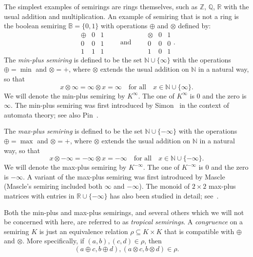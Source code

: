 \documentclass{amsart}
\newcommand{\AND}{\qquad\text{and}\qquad}
\newcommand{\R}{\mathbb{R}}
\newcommand{\Q}{\mathbb{Q}}
\newcommand{\Z}{\mathbb{Z}}
\newcommand{\N}{\mathbb{N}}
\numberwithin{equation}{section}
\theoremstyle{definition}
\begin{document}
The simplest examples of semirings are rings themselves, such as $\Z$, $\Q$,
$\R$ with the usual addition and multiplication. An example of semiring that is
not a ring is the boolean semiring $\mathbb{B} = \{0, 1\}$ with operations
$\oplus$ and $\otimes$ defined by:
\begin{equation*}
  \begin{array}{c|cc}
    \oplus & 0 & 1 \\
    \hline
    0      & 0 & 1 \\
    1      & 1 & 1 
  \end{array}\AND
  \begin{array}{c|cc}
    \otimes & 0 & 1 \\
    \hline
    0       & 0 & 0 \\
    1       & 0 & 1 
  \end{array}.
\end{equation*}
The \textit{min-plus semiring} is defined to be the set $\N \cup \{\infty\}$
with the operations $\oplus = \min$ and $\otimes = +$, where $\otimes$ extends
the usual addition on $\N$ in a natural way, so that
$$x \otimes \infty = \infty \otimes x = \infty  \quad \text{for all}\quad x\in
\N\cup \{\infty\}.$$
We will denote the min-plus semiring by $K^{\infty}$. The one of $K^{\infty}$
is $0$ and the zero is $\infty$.  The min-plus semiring was first introduced by
Simon~\cite{Simon1978aa} in the context of automata theory; see also
Pin~\cite{Pinab}.  

The \textit{max-plus semiring} is defined to be the set $\N \cup \{-\infty\}$
with the operations $\oplus = \max$ and $\otimes = +$, where $\otimes$ extends
the usual addition on $\N$ in a natural way, so that $$x \otimes -\infty =
-\infty \otimes x = -\infty  \quad \text{for all}\quad x\in \N\cup
\{-\infty\}.$$ We will denote the max-plus semiring by $K^{-\infty}$. The one
of $K^{-\infty}$ is $0$ and the zero is $-\infty$.  A variant of the max-plus
semiring was first introduced by Mascle~\cite{Mascle1986} (Mascle's semiring
included both $\infty$ and $-\infty$).  The monoid of $2\times 2$ max-plus
matrices with entries in $\R\cup \{-\infty\}$ has also been studied in detail;
see~\cite{Johnson2011aa}.

Both the min-plus and max-plus semirings, and several others which we will not be
concerned with here, are referred to as \textit{tropical semirings}. 
A \textit{congruence} on a semiring $K$ is just an equivalence relation
$\rho\subseteq K\times K$ that is compatible with $\oplus$ and $\otimes$.
More specifically, if $(a, b), (c, d)\in\rho$, then 
$$(a \oplus c, b \oplus d), (a\otimes c, b\otimes d) \in \rho.$$
\end{document}
